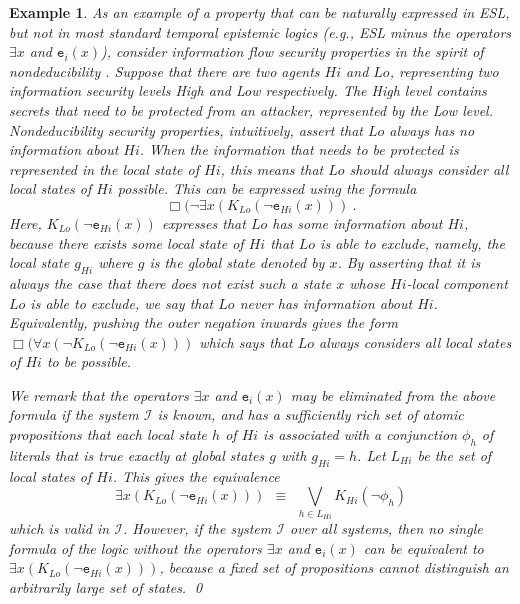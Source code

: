 \documentclass[a4wide]{article}
\theoremstyle{examplesty}
\newtheorem{example}{Example}
\newcommand{\I}{\mathcal{I}}
\newcommand{\lid}[2]{\mathtt{e}_{#1}(#2)}
\newcommand{\always}{\Box}
\newcommand{\Low}{Lo}
\newcommand{\High}{Hi}
\begin{document}
\begin{example} \label{ex:nondeducibility} 
As an example of a property that can be naturally expressed in ESL, 
but not in most standard temporal epistemic logics (e.g., ESL minus the 
operators $\exists x$ and $\lid{i}{x}$), 
consider information flow security properties
in the spirit of \emph{nondeducibility} \cite{sutherland_86}. Suppose that there are two 
agents $\High$ and $\Low$, representing two information 
security levels High and Low respectively. The High level contains secrets that need to be protected 
from an attacker, represented by the Low level. Nondeducibility security properties, intuitively, assert 
that $\Low$ always has no information  about $\High$. When the information that needs to be protected
is represented in the local state of $\High$, this means that $\Low$ should always consider all 
local states of $\High$ possible. This can be expressed using the formula 
$$\always( \neg \exists x( K_{\Low} (\neg  
\lid{\High}{x}
))~.$$ 
Here,
$  K_{\Low} (\neg  \lid{\High}{x})$ 
expresses that 
$\Low$ has some information about $\High$, because there exists 
some local state of $\High$ that $\Low$ is able to exclude, namely,  the local state $g_{\High}$ where $g$ is the global state
denoted by $x$.  By asserting that it is 
always 
the case
 that there does not exist such a state $x$ whose $\High$-local component $\Low$ is able to exclude, 
we say that $\Low$ never has information about $\High$. 
Equivalently, pushing the outer negation inwards gives the form 
$\always( \forall x( \neg K_{\Low} (\neg  
\lid{\High}{x}
))$
which says that $\Low$ always considers all local states of $\High$ to be possible. 



We remark that the operators $\exists x$ and $\lid{i}{x}$ may be eliminated
from the above formula if the system $\I$ is known, and has a sufficiently 
rich set of atomic propositions that each local state $h$ of 
$\High$
is associated with a 
conjunction $\phi_h$ of literals that is true exactly at global states $g$ with 
$g_{\High}=h$.  
Let $L_{\High}$ be the set of local states of $\High$. 
This gives the equivalence 
$$ \exists x( K_{\Low}( \neg \lid{\High}{x}))  ~~\equiv~~ \bigvee_{h \in L_{\High}}  K_{\High} ( \neg  \phi_h) $$ 
which is valid in $\I$. However, if the system $\I$  over all systems, then no single 
formula of the logic without the operators $\exists x$ and $\lid{i}{x}$ can 
be equivalent to 
$\exists x( K_{\Low}( \neg \lid{\High}{x}))$, 
because a fixed set of propositions cannot distinguish an arbitrarily large set of states. 
\qed
\end{example} 
\end{document}

